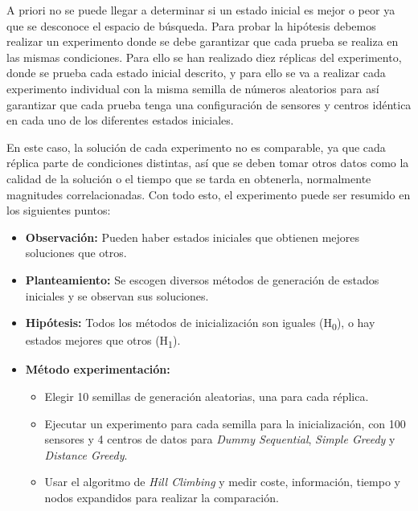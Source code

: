 \documentclass{article}
\begin{document}
\begin{enumerate}
  A priori no se puede llegar a determinar si un estado inicial es mejor o peor ya que se desconoce el espacio de búsqueda. Para probar la hipótesis debemos realizar un experimento donde se debe garantizar que cada prueba se realiza en las mismas condiciones. Para ello se han realizado diez réplicas del experimento, donde se prueba cada estado inicial descrito, y para ello se va a realizar cada experimento individual con la misma semilla de números aleatorios para así garantizar que cada prueba tenga una configuración de sensores y centros idéntica en cada uno de los diferentes estados iniciales.\par

  En este caso, la solución de cada experimento no es comparable, ya que cada réplica parte de condiciones distintas, así que se deben tomar otros datos como la calidad de la solución o el tiempo que se tarda en obtenerla, normalmente magnitudes correlacionadas. Con todo esto, el experimento puede ser resumido en los siguientes puntos:
  \begin{itemize}
    \item \textbf{Observación:} Pueden haber estados iniciales que obtienen mejores soluciones que otros.
    \item \textbf{Planteamiento:} Se escogen diversos métodos de generación de estados iniciales y se observan sus soluciones.
    \item \textbf{Hipótesis:} Todos los métodos de inicialización son iguales (H\textsubscript{0}), o hay estados mejores que otros (H\textsubscript{1}).
    \item \textbf{Método experimentación:} \begin{itemize}
        \item Elegir 10 semillas de generación aleatorias, una para cada réplica.
        \item Ejecutar un experimento para cada semilla para la inicialización, con 100 sensores y 4 centros de datos para \textit{Dummy Sequential}, \textit{Simple Greedy} y \textit{Distance Greedy}.
        \item Usar el algoritmo de \textit{Hill Climbing} y medir coste, información, tiempo y nodos expandidos para realizar la comparación.
    \end{itemize}
  \end{itemize}


\end{enumerate}
\end{document}
